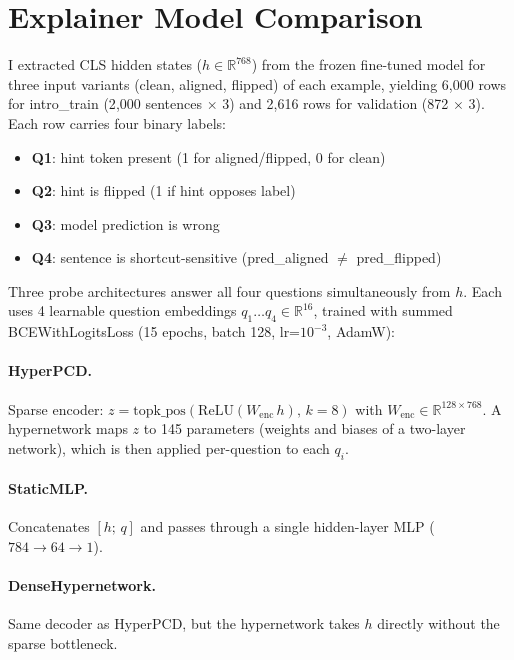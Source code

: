 \documentclass{article}
\begin{document}
\section{Explainer Model Comparison}
\label{sec:explainer}

I extracted CLS hidden states ($h \in \mathbb{R}^{768}$) from the frozen fine-tuned model for three input variants (clean, aligned, flipped) of each example, yielding 6{,}000 rows for intro\_train (2{,}000 sentences $\times$ 3) and 2{,}616 rows for validation (872 $\times$ 3). Each row carries four binary labels:
\begin{itemize}
    \setlength\itemsep{0pt}
    \item \textbf{Q1}: hint token present (1 for aligned/flipped, 0 for clean)
    \item \textbf{Q2}: hint is flipped (1 if hint opposes label)
    \item \textbf{Q3}: model prediction is wrong
    \item \textbf{Q4}: sentence is shortcut-sensitive (pred\_aligned $\neq$ pred\_flipped)
\end{itemize}

Three probe architectures answer all four questions simultaneously from $h$. Each uses 4 learnable question embeddings $q_1 \ldots q_4 \in \mathbb{R}^{16}$, trained with summed BCEWithLogitsLoss (15 epochs, batch 128, lr=$10^{-3}$, AdamW):

\paragraph{HyperPCD.} Sparse encoder: $z = \text{topk\_pos}(\text{ReLU}(W_\text{enc}\, h),\, k\!=\!8)$ with $W_\text{enc} \in \mathbb{R}^{128 \times 768}$. A hypernetwork maps $z$ to 145 parameters (weights and biases of a two-layer network), which is then applied per-question to each $q_i$.

\paragraph{StaticMLP.} Concatenates $[h;\, q]$ and passes through a single hidden-layer MLP ($784 \to 64 \to 1$).

\paragraph{DenseHypernetwork.} Same decoder as HyperPCD, but the hypernetwork takes $h$ directly without the sparse bottleneck.
\end{document}
